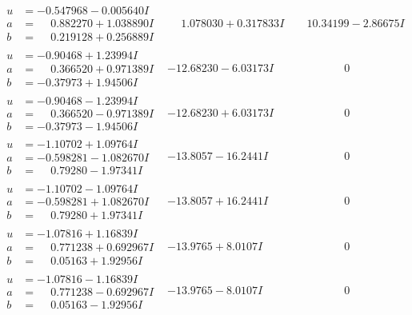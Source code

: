 \documentclass[1p]{elsarticle_modified}
\theoremstyle{definition}
\begin{document}
$$\begin{array}{c|c|c}
\begin{aligned}
u &= -0.547968 - 0.005640 I \\
a &= \phantom{-}0.882270 + 1.038890 I \\
b &= \phantom{-}0.219128 + 0.256889 I\end{aligned}
 & \phantom{-}1.078030 + 0.317833 I & \phantom{-}10.34199 - 2.86675 I \\ \hline\begin{aligned}
u &= -0.90468 + 1.23994 I \\
a &= \phantom{-}0.366520 + 0.971389 I \\
b &= -0.37973 + 1.94506 I\end{aligned}
 & -12.68230 - 6.03173 I & \phantom{-0.000000 } 0 \\ \hline\begin{aligned}
u &= -0.90468 - 1.23994 I \\
a &= \phantom{-}0.366520 - 0.971389 I \\
b &= -0.37973 - 1.94506 I\end{aligned}
 & -12.68230 + 6.03173 I & \phantom{-0.000000 } 0 \\ \hline\begin{aligned}
u &= -1.10702 + 1.09764 I \\
a &= -0.598281 - 1.082670 I \\
b &= \phantom{-}0.79280 - 1.97341 I\end{aligned}
 & -13.8057 - 16.2441 I & \phantom{-0.000000 } 0 \\ \hline\begin{aligned}
u &= -1.10702 - 1.09764 I \\
a &= -0.598281 + 1.082670 I \\
b &= \phantom{-}0.79280 + 1.97341 I\end{aligned}
 & -13.8057 + 16.2441 I & \phantom{-0.000000 } 0 \\ \hline\begin{aligned}
u &= -1.07816 + 1.16839 I \\
a &= \phantom{-}0.771238 + 0.692967 I \\
b &= \phantom{-}0.05163 + 1.92956 I\end{aligned}
 & -13.9765 + 8.0107 I & \phantom{-0.000000 } 0 \\ \hline\begin{aligned}
u &= -1.07816 - 1.16839 I \\
a &= \phantom{-}0.771238 - 0.692967 I \\
b &= \phantom{-}0.05163 - 1.92956 I\end{aligned}
 & -13.9765 - 8.0107 I & \phantom{-0.000000 } 0 \\ \hline\begin{aligned}

\end{aligned}
\end{array}$$
\end{document}
